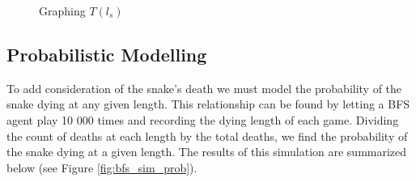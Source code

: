 \documentclass[12pt]{article}
\begin{document}
\begin{figure}[!h]
\centering
	\caption{Graphing $T(l_s)$}
	\label{fig:T_l_prelim_graph}
\end{figure}

\subsection{Probabilistic Modelling}

To add consideration of the snake's death we must model the probability of the snake dying at any given length. This relationship can be found by letting a BFS agent play 10 000 times and recording the dying length of each game. Dividing the count of deaths at each length by the total deaths, we find the probability of the snake dying at a given length. The results of this simulation are summarized below (see Figure \ref{fig:bfs_sim_prob}).
\end{document}

